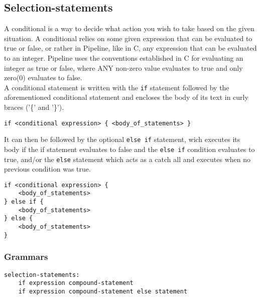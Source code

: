 \documentclass[./LRM_main.tex]{subfiles}
\begin{document}
\subsection{Selection-statements}
A conditional is a way to decide what action you wish to take based on the given situation. A conditional relies on some given expression that can be evaluated to true or false, or rather in Pipeline, like in C, any expression that can be evaluated to an integer. Pipeline uses the conventions established in C for evaluating an integer as true or false, where ANY non-zero value evaluates to true and only zero(0) evaluates to false.\\
A conditional statement is written with the \texttt{if} statement followed by the aforementioned conditional statement and encloses the body of its text in curly braces ('\{' and '\}').
\begin{lstlisting}
if <conditional expression> { <body_of_statements> }
\end{lstlisting}
It can then be followed by the optional \texttt{else if} statement, wich executes its body if the if statement evaluates to false and the \texttt{else if} condition evaluates to true, and/or the \texttt{else} statement which acts as a catch all and executes when no previous condition was true.
\begin{lstlisting}
if <conditional expression> {
	<body_of_statements>
} else if {
	<body_of_statements>
} else {
	<body_of_statements>
}
\end{lstlisting}
\subsubsection{Grammars}
\begin{lstlisting}
selection-statements:
	if expression compound-statement
	if expression compound-statement else statement
\end{lstlisting}
\end{document}
